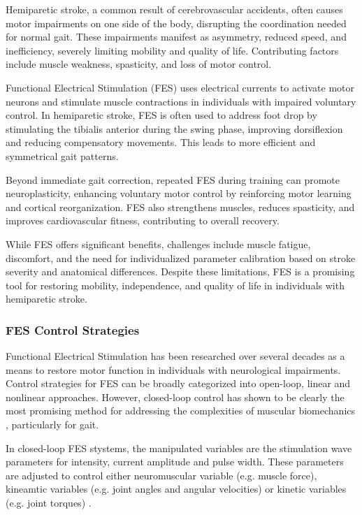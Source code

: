 Hemiparetic stroke, a common result of cerebrovascular accidents, often causes motor impairments on one side of the body, disrupting the coordination needed for normal gait. These impairments manifest as asymmetry, reduced speed, and inefficiency, severely limiting mobility and quality of life. Contributing factors include muscle weakness, spasticity, and loss of motor control.

Functional Electrical Stimulation (FES) uses electrical currents to activate motor neurons and stimulate muscle contractions in individuals with impaired voluntary control. In hemiparetic stroke, FES is often used to address foot drop by stimulating the tibialis anterior during the swing phase, improving dorsiflexion and reducing compensatory movements. This leads to more efficient and symmetrical gait patterns.

Beyond immediate gait correction, repeated FES during training can promote neuroplasticity, enhancing voluntary motor control by reinforcing motor learning and cortical reorganization. FES also strengthens muscles, reduces spasticity, and improves cardiovascular fitness, contributing to overall recovery.

While FES offers significant benefits, challenges include muscle fatigue, discomfort, and the need for individualized parameter calibration based on stroke severity and anatomical differences. Despite these limitations, FES is a promising tool for restoring mobility, independence, and quality of life in individuals with hemiparetic stroke.

\subsubsection{FES Control Strategies}
Functional Electrical Stimulation has been researched over several decades as a means to restore motor function in individuals with neurological impairments. Control strategies for FES can be broadly categorized into open-loop, linear and nonlinear approaches. However, closed-loop control has shown to be clearly the most promising method for addressing the complexities of muscular biomechanics \cite{chaikho_transcutaneous_2022}, particularly for gait.

In closed-loop FES stystems, the manipulated variables are the stimulation wave parameters for intensity, current amplitude and pulse width. These parameters are adjusted to control either neuromuscular variable (e.g. muscle force), kineamtic variables (e.g. joint angles and angular velocities) or kinetic variables (e.g. joint torques) \cite{chaikho_transcutaneous_2022}.

